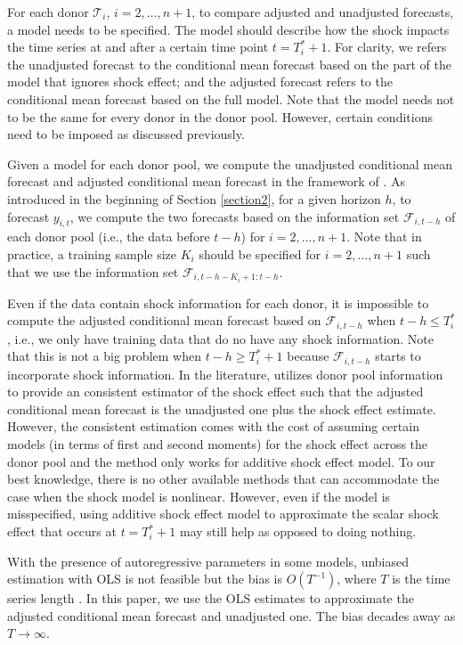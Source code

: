 \documentclass[11pt]{article}
\def\mc#1{\mathcal{#1}} %
\def\mc#1{\mathcal{#1}}
\theoremstyle{definition}
\begin{document}
For each donor $\mc{T}_i$, $i = 2, \ldots, n+1$, to compare adjusted and unadjusted forecasts,  a model needs to be specified. The model should describe how the shock impacts the time series at and after a certain time point $t= T_i^* + 1$. For clarity, we refers the unadjusted forecast to the conditional mean forecast based on the part of the model that ignores shock effect; and the adjusted forecast refers to the conditional mean forecast based on the full model. Note that the model needs not to be the same for every donor in the donor pool. However, certain conditions need to be imposed as discussed previously. 

 Given a model for each donor pool, we compute the unadjusted conditional mean forecast and adjusted conditional mean forecast in the framework of \cite{quaedvlieg2021multi}. As introduced in the beginning of Section \ref{section2}, for a given horizon $h$, to forecast $y_{i, t}$, we compute the two forecasts based on the information set $\mathcal{F}_{i, t-h}$ of each donor pool (i.e., the data before $t-h$) for $i = 2, \ldots, n+1$. Note that in practice, a training sample size $K_i$ should be specified for $i = 2, \ldots, n+1$ such that we use the information set $\mathcal{F}_{i, t-h-K_i + 1:t-h}$. 
 
 Even if the data contain shock information for each donor, it is impossible to compute the adjusted conditional mean forecast based on $\mathcal{F}_{i, t-h}$ when $t -h \leq T_i^*$, i.e., we only have training data that do no have any shock information. Note that this is not a big problem when $t-h \geq T_i^* +1$ because  $\mathcal{F}_{i, t-h}$ starts to incorporate shock information. In the literature, \cite{lin2021minimizing} utilizes donor pool information to provide an consistent estimator of the shock effect such that the adjusted  conditional mean forecast is the unadjusted one plus the shock effect estimate. However, the consistent estimation comes with the cost of assuming certain models (in terms of first and second moments) for the shock effect across the donor pool and the method only works for additive shock effect model.  To our best knowledge, there  is no other available methods that can accommodate the case when the shock model is nonlinear. However, even if the model is misspecified, using additive shock effect model to approximate the scalar shock effect that occurs at $t=T_i^*+1$ may still help as opposed to doing nothing. 
 
 With the presence of autoregressive parameters in some models, unbiased estimation with OLS  is not feasible but the bias is $O(T^{-1})$, where $T$ is the time series length \citep{shaman1988bias}. In this paper, we use the OLS estimates to approximate the adjusted conditional mean forecast and unadjusted one. The bias decades away as $T\to \infty$.
\end{document}
